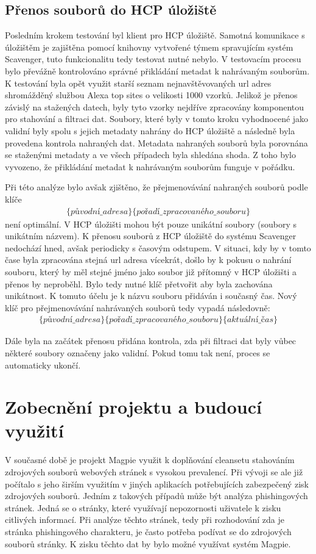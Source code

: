 \documentclass[thesis=M,czech,hidelinks]{FITthesis}[2013/05/06]
\begin{document}
\subsection{Přenos souborů do HCP úložiště}
Posledním krokem testování byl klient pro HCP úložiště. Samotná komunikace s úložištěm je zajištěna pomocí knihovny vytvořené týmem spravujícím systém Scavenger, tuto funkcionalitu tedy testovat nutné nebylo. V testovacím procesu bylo převážně kontrolováno správné přikládání metadat k nahrávaným souborům. K testování byla opět využit starší seznam nejnavštěvovaných url adres shromážděný službou Alexa top sites\cite{alexa} o velikosti 1000 vzorků. Jelikož je přenos závislý na stažených datech, byly tyto vzorky nejdříve zpracovány komponentou pro stahování a filtraci dat. Soubory, které byly v tomto kroku vyhodnocené jako validní byly spolu s jejich metadaty nahrány do HCP úložiště a následně byla provedena kontrola nahraných dat. Metadata nahraných souborů byla porovnána se staženými metadaty a ve všech případech byla shledána shoda. Z toho bylo vyvozeno, že přikládání metadat k nahrávaným souborům funguje v pořádku. 

Při této analýze bylo avšak zjištěno, že přejmenovávání nahraných souborů podle klíče
\begin{eqnarray}\label{prej}
\{původní\_ adresa\}\{pořadí\_ zpracovaného\_ souboru\}
\end{eqnarray}
 není optimální. V HCP úložišti mohou být pouze unikátní soubory (soubory s unikátním názvem). K přenosu souborů z HCP úložiště do systému Scavenger nedochází hned, avšak periodicky s časovým odstupem. V situaci, kdy by v tomto čase byla zpracována stejná url adresa vícekrát, došlo by k pokusu o nahrání souboru, který by měl stejné jméno jako soubor již přítomný v HCP úložišti a přenos by neproběhl. Bylo tedy nutné klíč přetvořit aby byla zachována unikátnost. K tomuto účelu je k názvu souboru přidáván i současný čas. Nový klíč pro přejmenovávání nahrávaných souborů tedy vypadá následovně: 
\begin{eqnarray}\label{prejm}
\{původní\_ adresa\}\{pořadí\_ zpracovaného\_ souboru\}\{aktuální\_čas\}
\end{eqnarray}

Dále byla na začátek přenosu přidána kontrola, zda při filtraci dat byly vůbec některé soubory označeny jako validní. Pokud tomu tak není, proces se automaticky ukončí.

\section{Zobecnění projektu a budoucí využití}
V současné době je projekt Magpie využit k doplňování cleansetu stahováním zdrojových souborů webových stránek s vysokou prevalencí. Při vývoji se ale již počítalo s jeho širším využitím v jiných aplikacích potřebujících zabezpečený zisk zdrojových souborů. Jedním z takových případů může být analýza phishingových stránek. Jedná se o stránky, které využívají nepozornosti uživatele k zisku citlivých informací. Při analýze těchto stránek, tedy při rozhodování zda je stránka phishingového charakteru, je často potřeba podívat se do zdrojových souborů stránky. K zisku těchto dat by bylo možné využívat systém Magpie. 
\end{document}

